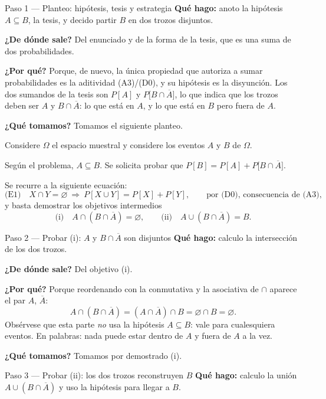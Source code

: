 \documentclass[11pt]{article}
\begin{document}
\begin{sol}

\begin{paso}{Paso 1 --- Planteo: hipótesis, tesis y estrategia}
\textbf{Qué hago:} anoto la hipótesis $A\subseteq B$, la tesis, y decido partir $B$ en dos
trozos disjuntos.

\textbf{¿De dónde sale?} Del enunciado y de la forma de la tesis, que es una suma de dos
probabilidades.

\textbf{¿Por qué?} Porque, de nuevo, la única propiedad que autoriza a sumar probabilidades es
la aditividad (A3)/(D0), y su hipótesis es la disyunción. Los dos sumandos de la tesis son
$P[A]$ y $P\big[B\cap\overline{A}\big]$, lo que indica que los trozos deben ser $A$ y
$B\cap\overline{A}$: lo que está en $A$, y lo que está en $B$ pero fuera de $A$.

\textbf{¿Qué tomamos?} Tomamos el siguiente planteo.

\medskip
Considere $\Omega$ el espacio muestral y considere los eventos $A$ y $B$ de $\Omega$.

Según el problema, $A\subseteq B$. Se solicita probar que
$P[B]=P[A]+P\big[B\cap\overline{A}\big]$.

\medskip
Se recurre a la siguiente ecuación:
\[
\text{(E1)}\quad X\cap Y=\varnothing\ \Longrightarrow\ P[X\cup Y]=P[X]+P[Y],
\qquad\text{por (D0), consecuencia de (A3),}
\]
y basta demostrar los objetivos intermedios
\[
\text{(i)}\quad A\cap(B\cap\overline{A})=\varnothing,
\qquad
\text{(ii)}\quad A\cup(B\cap\overline{A})=B .
\]
\end{paso}

\begin{paso}{Paso 2 --- Probar (i): $A$ y $B\cap\overline{A}$ son disjuntos}
\textbf{Qué hago:} calculo la intersección de los dos trozos.

\textbf{¿De dónde sale?} Del objetivo (i).

\textbf{¿Por qué?} Porque reordenando con la conmutativa y la asociativa de $\cap$ aparece el
par $A$, $\overline{A}$:
\[
A\cap(B\cap\overline{A})=(A\cap\overline{A})\cap B=\varnothing\cap B=\varnothing .
\]
Obsérvese que esta parte \emph{no} usa la hipótesis $A\subseteq B$: vale para cualesquiera
eventos. En palabras: nada puede estar dentro de $A$ y fuera de $A$ a la vez.

\textbf{¿Qué tomamos?} Tomamos por demostrado (i).
\end{paso}

\begin{paso}{Paso 3 --- Probar (ii): los dos trozos reconstruyen $B$}
\textbf{Qué hago:} calculo la unión $A\cup(B\cap\overline{A})$ y uso la hipótesis para llegar a
$B$.


\end{paso}
\end{sol}
\end{document}
